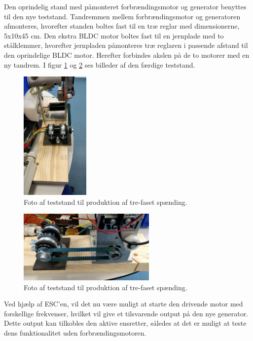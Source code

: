 Den oprindelig stand med påmonteret forbrændingsmotor og generator benyttes til den nye teststand. Tandremmen mellem forbrændingsmotor og generatoren afmonteres, hvorefter standen boltes fast til en træ reglar med dimensionerne, 5x10x45 cm. Den ekstra BLDC motor boltes fast til en jernplade med to stålklemmer, hvorefter jernpladen påmonteres træ reglaren i passende afstand til den oprindelige BLDC motor. Herefter forbindes akslen på de to motorer med en ny tandrem. I figur \ref{fig:nt1} og \ref{fig:nt2} ses billeder af den færdige teststand.
\clearpage
\begin{figure}[h]
  \centering
  \includegraphics[width=0.3\textwidth]{./figurer/nt1.png}
  \caption{Foto af teststand til produktion af tre-faset spænding.}
  \label{fig:nt1}
\end{figure}

\begin{figure}[h]
  \centering
  \includegraphics[width=0.6\textwidth]{./figurer/nt2.png}
  \caption{Foto af teststand til produktion af tre-faset spænding.}
  \label{fig:nt2}
\end{figure}

Ved hjælp af ESC'en, vil det nu være muligt at starte den drivende motor med forskellige frekvenser, hvilket vil give et tilsvarende output på den nye generator. Dette output kan tilkobles den aktive ensretter, således at det er muligt at teste dens funktionalitet uden forbrændingsmotoren. 

